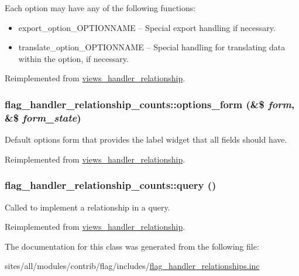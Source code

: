  Each option may have any of the following functions:\begin{itemize}
\item export\_\-option\_\-OPTIONNAME -- Special export handling if necessary.\item translate\_\-option\_\-OPTIONNAME -- Special handling for translating data within the option, if necessary. \end{itemize}


Reimplemented from \hyperlink{classviews__handler__relationship_7e7b7a0056836612aa50a60575a3d549}{views\_\-handler\_\-relationship}.\hypertarget{classflag__handler__relationship__counts_a99b83dd638a7e41aeaff5ae9c013efe}{
\subsubsection[{options\_\-form}]{\setlength{\rightskip}{0pt plus 5cm}flag\_\-handler\_\-relationship\_\-counts::options\_\-form (\&\$ {\em form}, \/  \&\$ {\em form\_\-state})}}
\label{classflag__handler__relationship__counts_a99b83dd638a7e41aeaff5ae9c013efe}


Default options form that provides the label widget that all fields should have. 

Reimplemented from \hyperlink{classviews__handler__relationship_08cc3f5947964d936b5e88d198f82c30}{views\_\-handler\_\-relationship}.\hypertarget{classflag__handler__relationship__counts_18060bfeb86c50ff51325f4dbeb93663}{
\subsubsection[{query}]{\setlength{\rightskip}{0pt plus 5cm}flag\_\-handler\_\-relationship\_\-counts::query ()}}
\label{classflag__handler__relationship__counts_18060bfeb86c50ff51325f4dbeb93663}


Called to implement a relationship in a query. 

Reimplemented from \hyperlink{classviews__handler__relationship_7dc0b6371807dbf06efa594cb52b3348}{views\_\-handler\_\-relationship}.

The documentation for this class was generated from the following file:\begin{CompactItemize}
\item 
sites/all/modules/contrib/flag/includes/\hyperlink{flag__handler__relationships_8inc}{flag\_\-handler\_\-relationships.inc}\end{CompactItemize}
